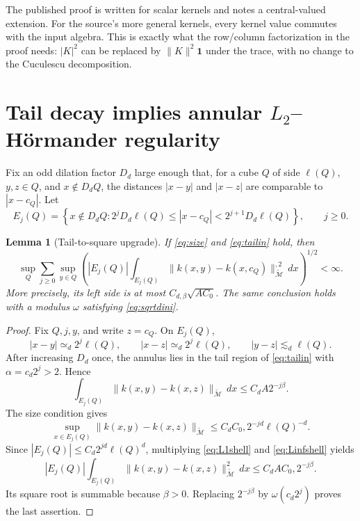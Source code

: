 \documentclass[11pt]{article}
\newtheorem{lemma}[theorem]{Lemma}
\newcommand{\Mt}{\widetilde{\mathcal M}}
\begin{document}
The published proof is written for scalar kernels and notes a central-valued
extension.  For the source's more general kernels, every kernel value commutes
with the input algebra.  This is exactly what the row/column factorization in
the proof needs: $|K|^2$ can be replaced by $\|K\|^2\mathbf1$ under the trace,
with no change to the Cuculescu decomposition.

\section{Tail decay implies annular \texorpdfstring{$L_2$}{L2}--H\"ormander regularity}

Fix an odd dilation factor $D_d$ large enough that, for a cube $Q$ of side
$\ell(Q)$, $y,z\in Q$, and $x\notin D_dQ$, the distances $|x-y|$ and
$|x-z|$ are comparable to $|x-c_Q|$.  Let
\[
 E_j(Q)=\left\{x\notin D_dQ:
  2^jD_d\ell(Q)\le |x-c_Q|<2^{j+1}D_d\ell(Q)\right\},
 \qquad j\ge0.
\]

\begin{lemma}[Tail-to-square upgrade]\label{lem:tail2}
If \eqref{eq:size} and \eqref{eq:tailin} hold, then
\begin{equation}\label{eq:H2}
 \sup_Q\sum_{j\ge0}\sup_{y\in Q}
 \left(
  |E_j(Q)|\int_{E_j(Q)}
  \|k(x,y)-k(x,c_Q)\|_{\Mt}^{,2}\,dx
 \right)^{1/2}<\infty.
\end{equation}
More precisely, its left side is at most
$C_{d,\beta}\sqrt{AC_0}$.  The same conclusion holds with a modulus
$\omega$ satisfying \eqref{eq:sqrtdini}.
\end{lemma}

\begin{proof}
Fix $Q,j,y$, and write $z=c_Q$.  On $E_j(Q)$,
\[
 |x-y|\simeq_d 2^j\ell(Q),\qquad
 |x-z|\simeq_d 2^j\ell(Q),\qquad |y-z|\lesssim_d\ell(Q).
\]
After increasing $D_d$ once, the annulus lies in the tail region of
\eqref{eq:tailin} with $\alpha=c_d2^j>2$.  Hence
\begin{equation}\label{eq:L1shell}
 \int_{E_j(Q)}\|k(x,y)-k(x,z)\|_{\Mt}\,dx
 \le C_dA2^{-j\beta}.
\end{equation}
The size condition gives
\begin{equation}\label{eq:Linfshell}
 \sup_{x\in E_j(Q)}\|k(x,y)-k(x,z)\|_{\Mt}
 \le C_dC_0,2^{-jd}\ell(Q)^{-d}.
\end{equation}
Since $|E_j(Q)|\le C_d2^{jd}\ell(Q)^d$, multiplying
\eqref{eq:L1shell} and \eqref{eq:Linfshell} yields
\[
 |E_j(Q)|\int_{E_j(Q)}
   \|k(x,y)-k(x,z)\|_{\Mt}^2\,dx
 \le C_dAC_0,2^{-j\beta}.
\]
Its square root is summable because $\beta>0$.  Replacing
$2^{-j\beta}$ by $\omega(c_d2^j)$ proves the last assertion.
\end{proof}
\end{document}
